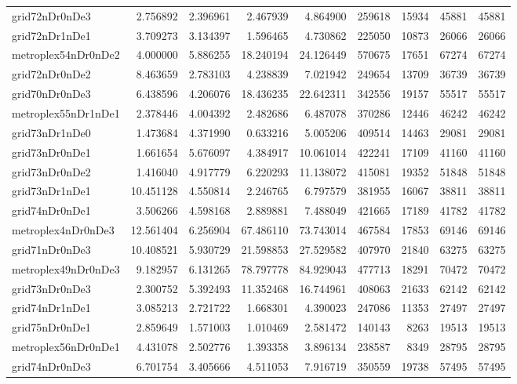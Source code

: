\begin{longtable}{|l|r|r|r|r|r|r|r|r|}
grid72nDr0nDe3 & 2.756892 & 2.396961 & 2.467939 & 4.864900 & 259618 & 15934 & 45881 & 45881 \\
grid72nDr1nDe1 & 3.709273 & 3.134397 & 1.596465 & 4.730862 & 225050 & 10873 & 26066 & 26066 \\
metroplex54nDr0nDe2 & 4.000000 & 5.886255 & 18.240194 & 24.126449 & 570675 & 17651 & 67274 & 67274 \\
grid72nDr0nDe2 & 8.463659 & 2.783103 & 4.238839 & 7.021942 & 249654 & 13709 & 36739 & 36739 \\
grid70nDr0nDe3 & 6.438596 & 4.206076 & 18.436235 & 22.642311 & 342556 & 19157 & 55517 & 55517 \\
metroplex55nDr1nDe1 & 2.378446 & 4.004392 & 2.482686 & 6.487078 & 370286 & 12446 & 46242 & 46242 \\
grid73nDr1nDe0 & 1.473684 & 4.371990 & 0.633216 & 5.005206 & 409514 & 14463 & 29081 & 29081 \\
grid73nDr0nDe1 & 1.661654 & 5.676097 & 4.384917 & 10.061014 & 422241 & 17109 & 41160 & 41160 \\
grid73nDr0nDe2 & 1.416040 & 4.917779 & 6.220293 & 11.138072 & 415081 & 19352 & 51848 & 51848 \\
grid73nDr1nDe1 & 10.451128 & 4.550814 & 2.246765 & 6.797579 & 381955 & 16067 & 38811 & 38811 \\
grid74nDr0nDe1 & 3.506266 & 4.598168 & 2.889881 & 7.488049 & 421665 & 17189 & 41782 & 41782 \\
metroplex4nDr0nDe3 & 12.561404 & 6.256904 & 67.486110 & 73.743014 & 467584 & 17853 & 69146 & 69146 \\
grid71nDr0nDe3 & 10.408521 & 5.930729 & 21.598853 & 27.529582 & 407970 & 21840 & 63275 & 63275 \\
metroplex49nDr0nDe3 & 9.182957 & 6.131265 & 78.797778 & 84.929043 & 477713 & 18291 & 70472 & 70472 \\
grid73nDr0nDe3 & 2.300752 & 5.392493 & 11.352468 & 16.744961 & 408063 & 21633 & 62142 & 62142 \\
grid74nDr1nDe1 & 3.085213 & 2.721722 & 1.668301 & 4.390023 & 247086 & 11353 & 27497 & 27497 \\
grid75nDr0nDe1 & 2.859649 & 1.571003 & 1.010469 & 2.581472 & 140143 & 8263 & 19513 & 19513 \\
metroplex56nDr0nDe1 & 4.431078 & 2.502776 & 1.393358 & 3.896134 & 238587 & 8349 & 28795 & 28795 \\
grid74nDr0nDe3 & 6.701754 & 3.405666 & 4.511053 & 7.916719 & 350559 & 19738 & 57495 & 57495 \\

\end{longtable}
